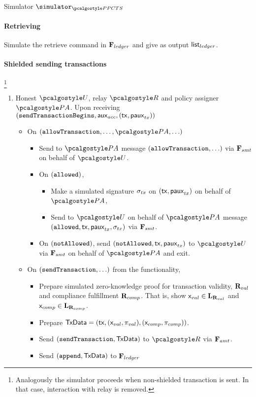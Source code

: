 \documentclass[runningheads,10pt]{llncs}
\numberwithin{equation}{section}
\begin{document}
\begin{simbox}{Simulator $\simulator_{\PPCTS}$}
  \paragraph{Retrieving}
  Simulate the retrieve command in $\mathbf{F}_{{ledger}}$ and give as output
  ${\mathsf{list}_{ledger}}$.

  \paragraph{Shielded sending transactions}\footnote{Analogously the simulator proceeds
    when non-shielded transaction is sent. In that case, interaction with relay is removed.}
  \begin{enumerate}
  \item Honest $\user$, relay $\relay$ and policy assigner $\polas$. Upon receiving
    $(\mathtt{sendTransactionBegins}, \mathsf{aux}_{acc}, (\mathsf{tx}, \mathsf{paux}_{tx}))$
    \begin{itemize}
    \item On $(\allowTransaction, \ldots, \polas, \ldots)$
      \begin{itemize}
      \item Send to $\polas$ message $(\mathtt{allowTransaction}, \ldots)$ via
        $\mathbf{F}_{{smt}}$ on behalf of $\user$.
      \item On $(\mathtt{allowed})$,
        \begin{itemize}
        \item Make a simulated signature $\sigma_{tx}$ on $(\mathsf{tx}, \mathsf{paux}_{tx})$
          on behalf of $\polas$,
        \item Send to $\user$ on behalf of $\polas$ message $(\mathtt{allowed},
           \mathsf{tx}, \mathsf{paux}_{tx}, \sigma_{tx})$ via $\mathbf{F}_{{smt}}$. 
        \end{itemize}
      \item On $(\mathtt{notAllowed})$, send $(\mathtt{notAllowed}, \mathsf{tx}, \mathsf{paux}_{tx})$ to $\user$
        via $\mathbf{F}_{{smt}}$ on behalf of $\polas$ and exit.
      \end{itemize}
    \item On $(\mathtt{sendTransaction}, \ldots)$ from the functionality,
      \begin{itemize}
      \item Prepare simulated zero-knowledge proof for transaction validity,
        $\mathbf{R}_{val}$ and compliance fulfillment $\mathbf{R}_{comp}$. That is, show
        $\mathsf{x}_{val} \in \mathbf{L}_{\mathbf{R}_{val}}$ and $\mathsf{x}_{comp} \in
        \mathbf{L}_{\mathbf{R}_{comp}}$.
      \item Prepare $\mathsf{TxData} = (\mathsf{tx}, (\mathsf{x}_{val}, \mathsf{\pi}_{val}),
        (\mathsf{x}_{comp}, \mathsf{\pi}_{comp}))$.
      \item Send $(\mathtt{sendTransaction}, \mathsf{TxData})$ to $\relay$ via $\mathbf{F}_{{amt}}$.
      \item {}Send $(\mathtt{append}, \mathsf{TxData})$ to $\mathbf{F}_{{ledger}}$       
      \end{itemize}
    \end{itemize}


\end{enumerate}
\end{simbox}
\end{document}
